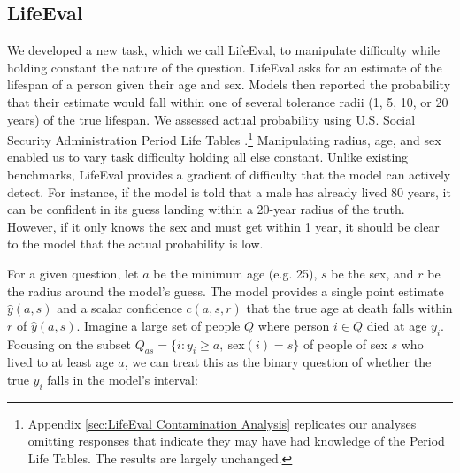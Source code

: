\documentclass{article}
\begin{document}
\subsection{LifeEval}
We developed a new task, which we call LifeEval, to manipulate difficulty while holding constant the nature of the question. LifeEval asks for an estimate of the lifespan of a person given their age and sex. Models then reported the probability that their estimate would fall within one of several tolerance radii (1, 5, 10, or 20 years) of the true lifespan. We assessed actual probability using U.S. Social Security Administration Period Life Tables \citep{SSA2022LifeTable}.\footnote{Appendix \ref{sec:LifeEval Contamination Analysis} replicates our analyses omitting responses that indicate they may have had knowledge of the Period Life Tables. The results are largely unchanged.} Manipulating radius, age, and sex enabled us to vary task difficulty holding all else constant. Unlike existing benchmarks, LifeEval provides a gradient of difficulty that the model can actively detect. For instance, if the model is told that a male has already lived 80 years, it can be confident in its guess landing within a 20-year radius of the truth. However, if it only knows the sex and must get within 1 year, it should be clear to the model that the actual probability is low. 

 For a given question, let $a$ be the minimum age (e.g. 25), $s$ be the sex, and $r$ be the radius around the model's guess. The model provides a single point estimate $\hat{y}(a,s)$  and a scalar confidence $c(a,s,r)$ that the true age at death falls within $r$ of $\hat{y}(a,s)$.  Imagine a large set of people $Q$ where person $i\in Q$ died at age $y_i$. Focusing on the subset $Q_{as}=\{i: y_i\ge a,\ \text{sex}(i)=s\}$ of people of sex $s$ who lived to at least age $a$, we can treat this as the binary question of whether the true $y_i$ falls in the model's interval:
\end{document}
